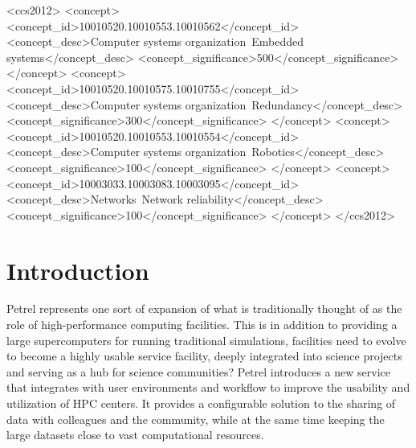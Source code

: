 \documentclass[sigconf]{acmart}
\begin{document}
%
%
\begin{CCSXML}
<ccs2012>
 <concept>
  <concept_id>10010520.10010553.10010562</concept_id>
  <concept_desc>Computer systems organization~Embedded systems</concept_desc>
  <concept_significance>500</concept_significance>
 </concept>
 <concept>
  <concept_id>10010520.10010575.10010755</concept_id>
  <concept_desc>Computer systems organization~Redundancy</concept_desc>
  <concept_significance>300</concept_significance>
 </concept>
 <concept>
  <concept_id>10010520.10010553.10010554</concept_id>
  <concept_desc>Computer systems organization~Robotics</concept_desc>
  <concept_significance>100</concept_significance>
 </concept>
 <concept>
  <concept_id>10003033.10003083.10003095</concept_id>
  <concept_desc>Networks~Network reliability</concept_desc>
  <concept_significance>100</concept_significance>
 </concept>
</ccs2012>  
\end{CCSXML}





\maketitle

\section{Introduction}

Petrel represents one sort of expansion of what is traditionally thought of as the role of high-performance computing facilities\cite{UrPa16}. This is in addition to providing a large supercomputers for running traditional simulations, facilities need to evolve to become a highly usable service facility, deeply integrated into science projects and serving as a hub for science communities? Petrel introduces a new service that integrates with user environments and workflow to improve the usability and utilization of HPC centers. It provides a configurable solution to the sharing of data with colleagues and the community, while at the  same time keeping the large datasets close to vast computational resources.
\end{document}
